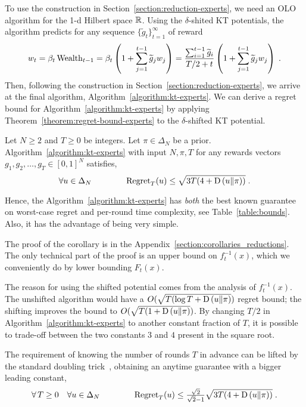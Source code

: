 To use the construction in Section~\ref{section:reduction-experts}, we need an
OLO algorithm for the 1-d Hilbert space $\mathbb{R}$.  Using the $\delta$-shited KT
potentials, the algorithm predicts for any sequence $\{\widetilde
g_t\}_{t=1}^\infty$ of reward
\[
w_t
= \beta_t \operatorname{Wealth}_{t-1}
= \beta_t \left(1 + \sum_{j=1}^{t-1} \widetilde g_j w_j \right)
= \frac{\sum_{i=1}^{t-1} \widetilde g_i}{T/2+t} \left(1 + \sum_{j=1}^{t-1} \widetilde g_j w_j \right) \; .
\]
Then, following the construction in Section~\ref{section:reduction-experts}, we
arrive at the final algorithm, Algorithm~\ref{algorithm:kt-experts}.
We can derive a regret bound for Algorithm~\ref{algorithm:kt-experts} by
applying Theorem~\ref{theorem:regret-bound-experts} to the $\delta$-shifted KT
potential.
%
\begin{corollary} \label{corollary:kt-experts-regret} Let
$N \ge 2$ and $T \ge 0$ be integers. Let $\pi \in \Delta_N$ be a prior.
Algorithm~\ref{algorithm:kt-experts} with input $N,\pi,T$
for any rewards vectors $g_1, g_2, \dots, g_T \in [0,1]^N$ satisfies,
\[
\forall u \in \Delta_N \qquad \qquad \operatorname{Regret}_T(u) \le \sqrt{3T (4 + \operatorname{D}\left({u}\middle\|{\pi}\right))} \; .
\]
\end{corollary}
%
Hence, the Algorithm~\ref{algorithm:kt-experts} has \emph{both} the best known
guarantee on worst-case regret and per-round time complexity, see
Table~\ref{table:bounds}. Also, it has the advantage of being very simple.

The proof of the corollary is in the
Appendix~\ref{section:corollaries_reductions}.  The only technical part of the proof
is an upper bound on $f_t^{-1}(x)$, which we conveniently do by lower bounding
$F_t(x)$.

The reason for using the shifted potential comes from the analysis of
$f_t^{-1}(x)$. The unshifted algorithm would have a $O(\sqrt{T (\log T +
\operatorname{D}\left({u}\middle\|{\pi}\right)})$ regret bound; the shifting improves the bound to $O(\sqrt{T (1 +
\operatorname{D}\left({u}\middle\|{\pi}\right)})$.  By changing $T/2$ in Algorithm~\ref{algorithm:kt-experts} to
another constant fraction of $T$, it is possible to trade-off between the two
constants $3$ and $4$ present in the square root.

The requirement of knowing the number of rounds $T$ in advance can be lifted by
the standard doubling trick~\cite[Section 2.3.1]{Shalev-Shwartz-2011},
obtaining an anytime guarantee with a bigger leading constant,
\[
\forall \, T \ge 0 \quad \forall u \in \Delta_N \qquad \qquad
\operatorname{Regret}_T(u) \le \tfrac{\sqrt{2}}{\sqrt{2} - 1} \sqrt{3T (4 + \operatorname{D}\left({u}\middle\|{\pi}\right))} \; .
\]
